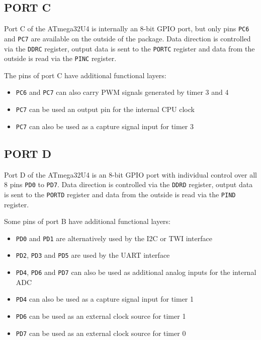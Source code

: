 \begin{multicols}{2}
\subsection{PORT C}
  Port C of the ATmega32U4 is internally an 8-bit GPIO port, but only pins \lstinline!PC6! and \lstinline!PC7!
  are available on the outside of the package. Data direction is controlled via the \lstinline!DDRC!
  register, output data is sent to the \lstinline!PORTC! register and
  data from the outside is read via the \lstinline!PINC! register.

  The pins of port C have additional functional layers:
  \begin{itemize}\tightlist
    \item \lstinline!PC6! and \lstinline!PC7! can also carry PWM signals generated by timer 3 and 4
    \item \lstinline!PC7! can be used an output pin for the internal CPU clock
    \item \lstinline!PC7! can also be used as a capture signal input for timer 3
  \end{itemize}

\subsection{PORT D}
  Port D of the ATmega32U4 is an 8-bit GPIO port with individual control over
  all 8 pins \lstinline!PD0! to \lstinline!PD7!. Data direction is controlled via the \lstinline!DDRD!
  register, output data is sent to the \lstinline!PORTD! register and
  data from the outside is read via the \lstinline!PIND! register.

  Some pins of port B have additional functional layers:
  \begin{itemize}\tightlist
    \item \lstinline!PD0! and \lstinline!PD1! are alternatively used by the I2C or TWI interface
    \item \lstinline!PD2!, \lstinline!PD3! and \lstinline!PD5! are used by the UART interface
    \item \lstinline!PD4!, \lstinline!PD6! and \lstinline!PD7! can also be used as additional analog inputs for the internal ADC
    \item \lstinline!PD4! can also be used as a capture signal input for timer 1
    \item \lstinline!PD6! can be used as an external clock source for timer 1
    \item \lstinline!PD7! can be used as an external clock source for timer 0
  \end{itemize}



\end{multicols}
